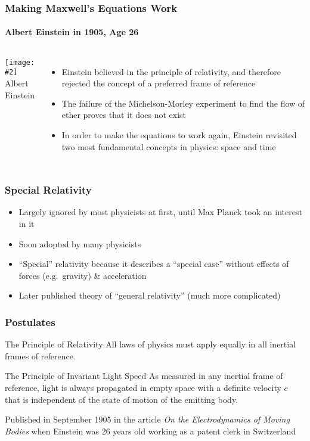 \documentclass[12pt,compress,aspectratio=169]{beamer}
\newcommand{\pic}[2]{\texttt{[image: \#2]}}
\begin{document}
\begin{frame}
  \frametitle{Making Maxwell's Equations Work}
  \framesubtitle{Albert Einstein in 1905, Age 26}
  \begin{columns}
    \pic{1.1}{graphics/Einstein_patentoffice.jpg}\\
    {\footnotesize Albert Einstein}
  
    \begin{itemize}
    \item Einstein believed in the principle of relativity, and therefore
      rejected the concept of a preferred frame of reference
    \item The failure of the Michelson-Morley experiment to find the flow of
      ether proves that it does not exist
    \item In order to make the equations to work again, Einstein revisited two
      most fundamental concepts in physics: space and time
    \end{itemize}
  \end{columns}
\end{frame}



\begin{frame}
  \frametitle{Special Relativity}
  \begin{itemize}
  \item Largely ignored by most physicists at first, until Max Planck took an
    interest in it
  \item Soon adopted by many physicists
  \item ``Special'' relativity because it describes a ``special case'' without
    effects of forces (e.g.\ gravity) \& acceleration
  \item Later published theory of ``general relativity'' (much more complicated)
  \end{itemize}
\end{frame}



\begin{frame}
  \frametitle{Postulates}
  \begin{block}{The Principle of Relativity}
    All laws of physics must apply equally in all inertial frames of reference.
  \end{block}

  \begin{block}{The Principle of Invariant Light Speed}
    As measured in any inertial frame of reference, light is always propagated
    in empty space with a definite velocity $c$ that is independent of the
    state of motion of the emitting body.
  \end{block}

  \vspace{.15in}Published in September 1905 in the article
  \emph{On the Electrodynamics of Moving Bodies} when Einstein was 26 years old
  working as a patent clerk in Switzerland
\end{frame}
\end{document}
